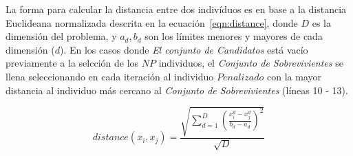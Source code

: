 La forma para calcular la distancia entre dos indivíduos es en base a la distancia Euclideana normalizada descrita en la ecuación~\ref{eqn:distance}, donde $D$ es la dimensión del problema, y $a_d, b_d$ son los límites menores y mayores de cada dimensión ($d$).
%
%
En los casos donde \textit{El conjunto de Candidatos} está vacío previamente a la selcción de los $NP$ individuos, el \textit{Conjunto de Sobrevivientes} se llena seleccionando en cada iteración al individuo $Penalizado$ con la mayor distancia al individuo más cercano al \textit{Conjunto de Sobrevivientes} (líneas 10 - 13).

\begin{equation}\label{eqn:distance}
distance ( x_{i}, x_j ) = \frac{\sqrt{ \sum_{d=1}^D \left ( \frac{x_{i}^d - x_j^d}{b_d - a_d} \right )^2  }} {\sqrt{D}}
\end{equation}


